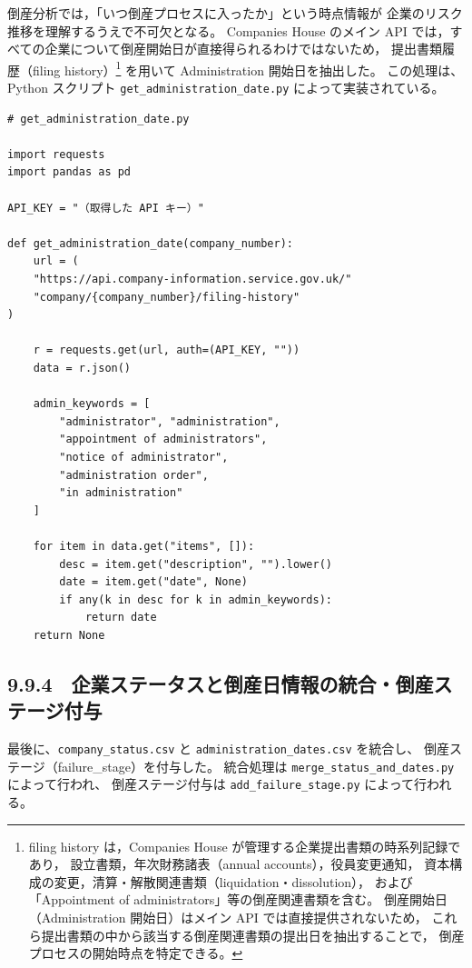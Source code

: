 倒産分析では，「いつ倒産プロセスに入ったか」という時点情報が
企業のリスク推移を理解するうえで不可欠となる。
Companies House のメイン API では，すべての企業について倒産開始日が直接得られるわけではないため，
提出書類履歴（filing history）\footnote{
filing history は，Companies House が管理する企業提出書類の時系列記録であり，
設立書類，年次財務諸表（annual accounts），役員変更通知，
資本構成の変更，清算・解散関連書類（liquidation・dissolution），
および「Appointment of administrators」等の倒産関連書類を含む。
倒産開始日（Administration 開始日）はメイン API では直接提供されないため，
これら提出書類の中から該当する倒産関連書類の提出日を抽出することで，
倒産プロセスの開始時点を特定できる。
} を用いて Administration 開始日を抽出した。
この処理は、Python スクリプト \texttt{get\_administration\_date.py} によって実装されている。

\begin{verbatim}
# get_administration_date.py

import requests
import pandas as pd

API_KEY = "（取得した API キー）"

def get_administration_date(company_number):
    url = (
    "https://api.company-information.service.gov.uk/"
    "company/{company_number}/filing-history"
)

    r = requests.get(url, auth=(API_KEY, ""))
    data = r.json()

    admin_keywords = [
        "administrator", "administration",
        "appointment of administrators",
        "notice of administrator",
        "administration order",
        "in administration"
    ]

    for item in data.get("items", []):
        desc = item.get("description", "").lower()
        date = item.get("date", None)
        if any(k in desc for k in admin_keywords):
            return date
    return None
\end{verbatim}


\subsection*{9.9.4　企業ステータスと倒産日情報の統合・倒産ステージ付与}

最後に、\texttt{company\_status.csv} と \texttt{administration\_dates.csv} を統合し、
倒産ステージ（failure\_stage）を付与した。
統合処理は \texttt{merge\_status\_and\_dates.py} によって行われ、
倒産ステージ付与は \texttt{add\_failure\_stage.py} によって行われる。

